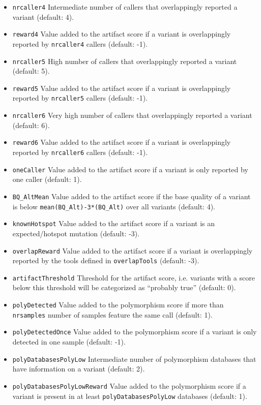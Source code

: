 \documentclass{article}
\begin{document}
\begin{itemize}
  \item \texttt{nrcaller4} Intermediate number of callers that overlappingly reported a variant (default: 4).
  \item \texttt{reward4} Value added to the artifact score if a variant is overlappingly reported by \texttt{nrcaller4} callers (default: -1).
  \item \texttt{nrcaller5} High number of callers that overlappingly reported a variant (default: 5).
  \item \texttt{reward5} Value added to the artifact score if a variant is overlappingly reported by \texttt{nrcaller5} callers (default: -1).
  \item \texttt{nrcaller6} Very high number of callers that overlappingly reported a variant (default: 6).
  \item \texttt{reward6} Value added to the artifact score if a variant is overlappingly reported by \texttt{nrcaller6} callers (default: -1).
  \item \texttt{oneCaller} Value added to the artifact score if a variant is only reported by one caller (default: 1).
  \item \texttt{BQ\_AltMean} Value added to the artifact score if the base quality of a variant is below \texttt{mean(BQ\_Alt)-3*(BQ\_Alt)} over all variants (default: 4).
  \item \texttt{knownHotspot} Value added to the artifact score if a variant is an expected/hotspot mutation (default: -3).
  \item \texttt{overlapReward} Value added to the artifact score if a variant is overlappingly reported by the tools defined in \texttt{overlapTools} (default: -3).
  \item \texttt{artifactThreshold} Threshold for the artifact score, i.e. variants with a score below this threshold will be categorized as ``probably true'' (default: 0).
  \item \texttt{polyDetected} Value added to the polymorphism score if more than \texttt{nrsamples} number of samples feature the same call (default: 1).
  \item \texttt{polyDetectedOnce} Value added to the polymorphism score if a variant is only detected in one sample (default: -1).
  \item \texttt{polyDatabasesPolyLow} Intermediate number of polymorphism databases that have information on a variant (default: 2).
  \item \texttt{polyDatabasesPolyLowReward} Value added to the polymorphism score if a variant is present in at least \texttt{polyDatabasesPolyLow} databases (default: 1).

\end{itemize}
\end{document}
